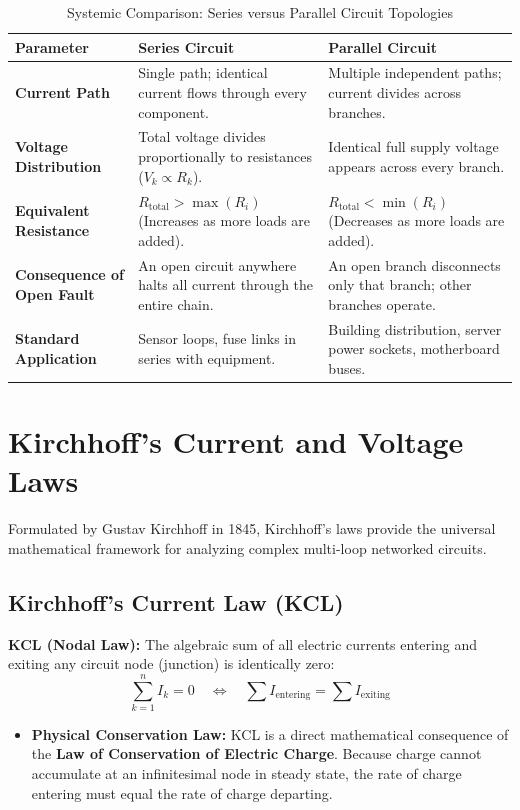 \begin{table}[htbp]
\centering
\small
\caption{Systemic Comparison: Series versus Parallel Circuit Topologies}
\label{tab:series_vs_parallel}
\begin{tabularx}{\textwidth}{l X X}
\toprule
\textbf{Parameter} & \textbf{Series Circuit} & \textbf{Parallel Circuit} \\
\midrule
\textbf{Current Path} & Single path; identical current flows through every component. & Multiple independent paths; current divides across branches. \\
\textbf{Voltage Distribution} & Total voltage divides proportionally to resistances ($V_k \propto R_k$). & Identical full supply voltage appears across every branch. \\
\textbf{Equivalent Resistance} & $R_{\text{total}} > \max(R_i)$ (Increases as more loads are added). & $R_{\text{total}} < \min(R_i)$ (Decreases as more loads are added). \\
\textbf{Consequence of Open Fault} & An open circuit anywhere halts all current through the entire chain. & An open branch disconnects only that branch; other branches operate. \\
\textbf{Standard Application} & Sensor loops, fuse links in series with equipment. & Building distribution, server power sockets, motherboard buses. \\
\bottomrule
\end{tabularx}
\end{table}


\section{Kirchhoff's Current and Voltage Laws}
\label{sec:kirchhoffs_laws}

Formulated by Gustav Kirchhoff in 1845, Kirchhoff's laws provide the universal mathematical framework for analyzing complex multi-loop networked circuits.

\subsection{Kirchhoff's Current Law (KCL)}
\textbf{KCL (Nodal Law):} The algebraic sum of all electric currents entering and exiting any circuit node (junction) is identically zero:
\begin{equation}
\label{eq:kcl_formula}
\boxed{\sum_{k=1}^{n} I_k = 0 \quad \Longleftrightarrow \quad \sum I_{\text{entering}} = \sum I_{\text{exiting}}}
\end{equation}
\begin{itemize}
    \item \textbf{Physical Conservation Law:} KCL is a direct mathematical consequence of the \textbf{Law of Conservation of Electric Charge}. Because charge cannot accumulate at an infinitesimal node in steady state, the rate of charge entering must equal the rate of charge departing.
\end{itemize}

